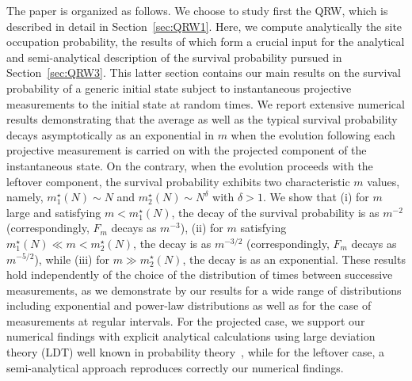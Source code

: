 \documentclass[12pt]{iopart}
\begin{document}
The paper is organized as follows. We choose to study first the QRW,
which is described in detail in Section~\ref{sec:QRW1}.  Here, we compute analytically the site occupation probability, the results of which form a crucial input for the analytical and semi-analytical description of the survival probability pursued in Section~\ref{sec:QRW3}.  This latter section contains our main
results on the survival probability of a generic initial state subject
to instantaneous projective measurements to the initial state at random times. We report extensive
numerical results demonstrating that the
average as well as the typical
survival probability decays asymptotically as an exponential in $m$ when the evolution following each projective measurement is carried on with the projected component of the instantaneous state.  On the contrary, when the evolution proceeds with the leftover component,  the survival probability exhibits two characteristic $m$ values, namely, $m_1^\star(N) \sim N$ and $m_2^\star(N) \sim N^\delta$ with $\delta >1$.  We show that (i) for $m$ large and satisfying $m < m_1^\star(N)$, the decay of the survival probability is as $m^{-2}$ (correspondingly, $F_m$ decays as $m^{-3}$),  (ii) for $m$ satisfying $m_1^\star(N) \ll m <m_2^\star(N)$, the decay is as $m^{-3/2
        }$ (correspondingly, $F_m$ decays as $m^{-5/2}$),  while (iii) for $m \gg m_2^\star(N)$, the decay is as an exponential.  These results
hold independently of the choice of the distribution of times between
successive measurements,  as we demonstrate by our results for a wide range of distributions including exponential and power-law distributions as well as for the case of measurements at regular intervals.  For the projected case, we support our numerical findings with
explicit analytical calculations using large deviation theory (LDT) well
known in probability theory~\cite{qua-ellis-book,qua-Touchette:2009},
while for the leftover case, a semi-analytical approach reproduces correctly
our numerical findings. 
\end{document}
